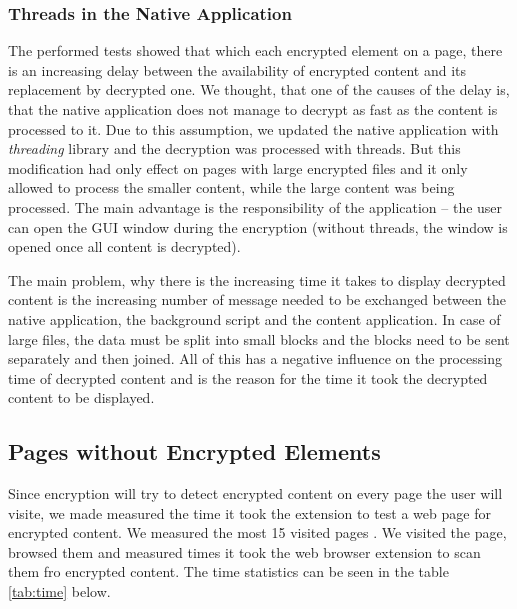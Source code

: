 \subsubsection*{Threads in the Native Application}
\label{test:performanceThreads}
The performed tests showed that which each encrypted element on a page, there is an increasing delay between the availability of encrypted content and its replacement by decrypted one. We thought, that one of the causes of the delay is, that the native application does not manage to decrypt as fast as the content is processed to it. Due to this assumption, we updated the native application with \textit{threading} library and the decryption was processed with threads. But this modification had only effect on pages with large encrypted files and it only allowed to process the smaller content, while the large content was being processed. The main advantage is the responsibility of the application -- the user can open the GUI window during the encryption (without threads, the window is opened once all content is decrypted).

The main problem, why there is the increasing time it takes to display decrypted content is the increasing number of message needed to be exchanged between the native application, the background script and the content application. In case of large files, the data must be split into small blocks and the blocks need to be sent separately and then joined. All of this has a negative influence on the processing time of decrypted content and is the reason for the time it took the decrypted content to be displayed.

\subsection{Pages without Encrypted Elements}
Since encryption will try to detect encrypted content on every page the user will visite, we made measured the time it took the extension to test a web page for encrypted content. We measured the most 15 visited pages \cite{topPages}. We visited the page, browsed them and measured times it took the web browser extension to scan them fro encrypted content. The time statistics can be seen in the table \ref{tab:time} below.


